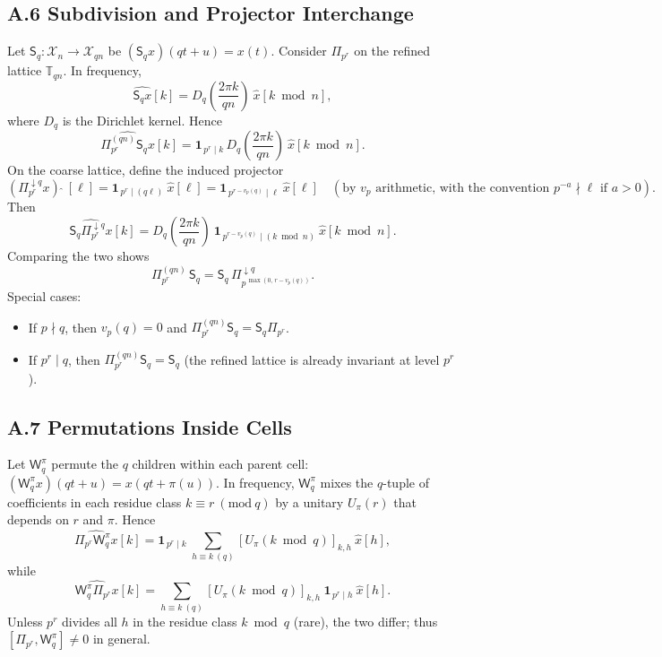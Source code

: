 \documentclass[12pt]{article}
\numberwithin{equation}{section}
\theoremstyle{plain}
\theoremstyle{definition}
\theoremstyle{remark}
\begin{document}
\subsection*{A.6 Subdivision and Projector Interchange}
Let $\mathsf{S}_q:\mathcal{X}_n\to\mathcal{X}_{qn}$ be $(\mathsf{S}_q x)(qt+u)=x(t)$. Consider $\Pi_{p^r}$ on the refined lattice $\mathbb{T}_{qn}$.
In frequency,
\[
\widehat{\mathsf{S}_q x}[k]=D_q\!\left(\frac{2\pi k}{qn}\right)\ \widehat{x}[k\bmod n],
\]
where $D_q$ is the Dirichlet kernel. Hence
\[
\widehat{\Pi_{p^r}^{(qn)}\mathsf{S}_q x}[k]
=\mathbf{1}_{\,p^r\mid k}\,D_q\!\left(\frac{2\pi k}{qn}\right)\ \widehat{x}[k\bmod n].
\]
On the coarse lattice, define the induced projector
\[
(\Pi_{p^r}^{\downarrow q}x)\ \widehat{}\ [\ell]=\mathbf{1}_{\,p^r\mid (q\ell)}\ \widehat{x}[\ell]
=\mathbf{1}_{\,p^{r-v_p(q)}\mid \ell}\ \widehat{x}[\ell]\quad(\text{by }v_p\text{ arithmetic, with the convention }p^{-a}\nmid \ell\text{ if }a>0).
\]
Then
\[
\widehat{\mathsf{S}_q \Pi_{p^r}^{\downarrow q}x}[k]
=D_q\!\left(\frac{2\pi k}{qn}\right)\ \mathbf{1}_{\,p^{r-v_p(q)}\mid (k\bmod n)}\ \widehat{x}[k\bmod n].
\]
Comparing the two shows
\[
\Pi_{p^r}^{(qn)}\,\mathsf{S}_q
=\mathsf{S}_q\,\Pi_{p^{\,\max(0,\,r-v_p(q))}}^{\downarrow q}.
\]
Special cases:
\begin{itemize}
\item If $p\nmid q$, then $v_p(q)=0$ and $\Pi_{p^r}^{(qn)}\mathsf{S}_q=\mathsf{S}_q\Pi_{p^r}$.
\item If $p^r\mid q$, then $\Pi_{p^r}^{(qn)}\mathsf{S}_q=\mathsf{S}_q$ (the refined lattice is already invariant at level $p^r$).
\end{itemize}

\subsection*{A.7 Permutations Inside Cells}
Let $\mathsf{W}_q^{\pi}$ permute the $q$ children within each parent cell: $(\mathsf{W}_q^{\pi}x)(qt+u)=x(qt+\pi(u))$.
In frequency, $\mathsf{W}_q^{\pi}$ mixes the $q$-tuple of coefficients in each residue class $k\equiv r\ (\mathrm{mod}\ q)$ by a unitary $U_\pi(r)$ that depends on $r$ and $\pi$. Hence
\[
\widehat{\Pi_{p^r}\mathsf{W}_q^{\pi}x}[k]=\mathbf{1}_{\,p^r\mid k}\ \sum_{h\equiv k\ (q)} [U_\pi(k\bmod q)]_{k,h}\ \widehat{x}[h],
\]
while
\[
\widehat{\mathsf{W}_q^{\pi}\Pi_{p^r}x}[k]=\sum_{h\equiv k\ (q)} [U_\pi(k\bmod q)]_{k,h}\ \mathbf{1}_{\,p^r\mid h}\ \widehat{x}[h].
\]
Unless $p^r$ divides all $h$ in the residue class $k\bmod q$ (rare), the two differ; thus $[\Pi_{p^r},\mathsf{W}_q^{\pi}]\neq 0$ in general.
\end{document}

